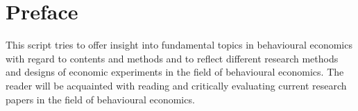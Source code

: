 

\chapter*{Preface}

This script tries to offer insight into fundamental topics in behavioural economics with regard to contents and methods and to reflect different research methods and designs of economic experiments in the field of behavioural economics. The reader will be acquainted with reading and critically evaluating current research papers in the field of behavioural economics. \\ \\